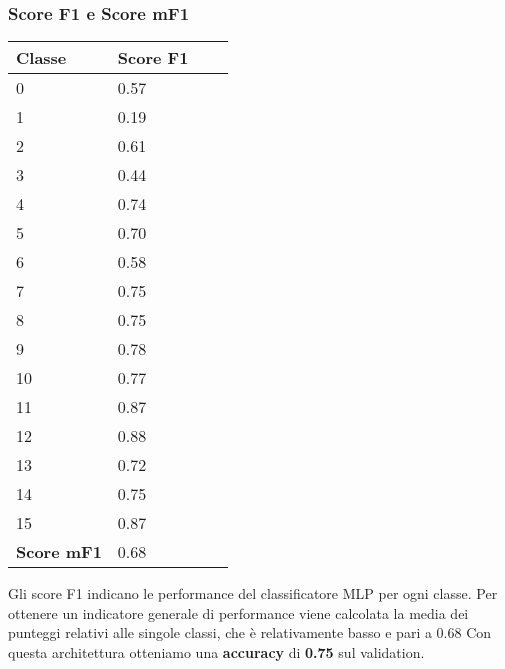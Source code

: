 \subsubsection{Score F1 e Score mF1}
\begin{center}
\begin{tabular}{| l | l | l | l |}
	\hline
	Classe & Score F1 \\ \hline
	0 & 0.57 \\ \hline
	1 & 0.19 \\ \hline
	2 & 0.61 \\ \hline
	3 & 0.44\\ \hline
	4 & 0.74 \\ \hline
	5 & 0.70\\ \hline
	6 & 0.58 \\ \hline
	7 & 0.75\\ \hline
	8 & 0.75 \\ \hline
	9 & 0.78\\ \hline
	10 & 0.77 \\ \hline
	11 & 0.87 \\ \hline
	12 & 0.88 \\ \hline
	13 & 0.72 \\ \hline
	14 & 0.75\\ \hline
	15 & 0.87 \\ \hline 
	{\bf Score mF1} & 0.68 \\ \hline							
\end{tabular}
\end{center}
Gli score F1 indicano le performance del classificatore MLP per ogni classe. Per ottenere un indicatore generale di performance viene calcolata la media dei punteggi relativi alle singole classi, che è relativamente basso e pari a 0.68
\newline
Con questa architettura otteniamo una {\bf accuracy} di {\bf 0.75} sul validation. 

